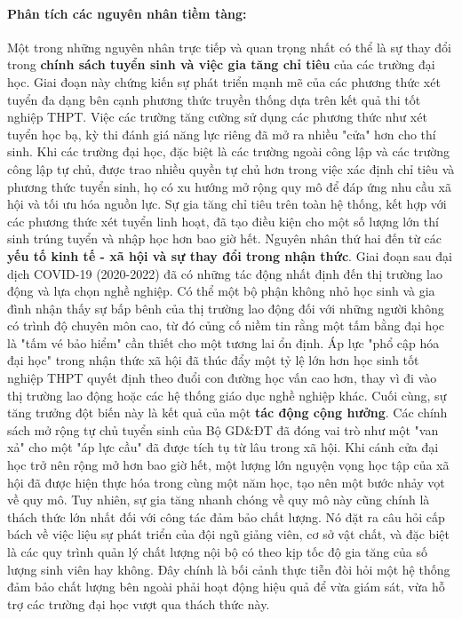 \documentclass[12pt, a4paper, openany]{report}
\begin{document}
\paragraph{Phân tích các nguyên nhân tiềm tàng:}
Một trong những nguyên nhân trực tiếp và quan trọng nhất có thể là sự thay đổi trong \textbf{chính sách tuyển sinh và việc gia tăng chỉ tiêu} của các trường đại học. Giai đoạn này chứng kiến sự phát triển mạnh mẽ của các phương thức xét tuyển đa dạng bên cạnh phương thức truyền thống dựa trên kết quả thi tốt nghiệp THPT. Việc các trường tăng cường sử dụng các phương thức như xét tuyển học bạ, kỳ thi đánh giá năng lực riêng đã mở ra nhiều "cửa" hơn cho thí sinh. Khi các trường đại học, đặc biệt là các trường ngoài công lập và các trường công lập tự chủ, được trao nhiều quyền tự chủ hơn trong việc xác định chỉ tiêu và phương thức tuyển sinh, họ có xu hướng mở rộng quy mô để đáp ứng nhu cầu xã hội và tối ưu hóa nguồn lực. Sự gia tăng chỉ tiêu trên toàn hệ thống, kết hợp với các phương thức xét tuyển linh hoạt, đã tạo điều kiện cho một số lượng lớn thí sinh trúng tuyển và nhập học hơn bao giờ hết.
Nguyên nhân thứ hai đến từ các \textbf{yếu tố kinh tế - xã hội và sự thay đổi trong nhận thức}. Giai đoạn sau đại dịch COVID-19 (2020-2022) đã có những tác động nhất định đến thị trường lao động và lựa chọn nghề nghiệp. Có thể một bộ phận không nhỏ học sinh và gia đình nhận thấy sự bấp bênh của thị trường lao động đối với những người không có trình độ chuyên môn cao, từ đó củng cố niềm tin rằng một tấm bằng đại học là "tấm vé bảo hiểm" cần thiết cho một tương lai ổn định. Áp lực "phổ cập hóa đại học" trong nhận thức xã hội đã thúc đẩy một tỷ lệ lớn hơn học sinh tốt nghiệp THPT quyết định theo đuổi con đường học vấn cao hơn, thay vì đi vào thị trường lao động hoặc các hệ thống giáo dục nghề nghiệp khác.
Cuối cùng, sự tăng trưởng đột biến này là kết quả của một \textbf{tác động cộng hưởng}. Các chính sách mở rộng tự chủ tuyển sinh của Bộ GD\&ĐT đã đóng vai trò như một "van xả" cho một "áp lực cầu" đã được tích tụ từ lâu trong xã hội. Khi cánh cửa đại học trở nên rộng mở hơn bao giờ hết, một lượng lớn nguyện vọng học tập của xã hội đã được hiện thực hóa trong cùng một năm học, tạo nên một bước nhảy vọt về quy mô.
Tuy nhiên, sự gia tăng nhanh chóng về quy mô này cũng chính là thách thức lớn nhất đối với công tác đảm bảo chất lượng. Nó đặt ra câu hỏi cấp bách về việc liệu sự phát triển của đội ngũ giảng viên, cơ sở vật chất, và đặc biệt là các quy trình quản lý chất lượng nội bộ có theo kịp tốc độ gia tăng của số lượng sinh viên hay không. Đây chính là bối cảnh thực tiễn đòi hỏi một hệ thống đảm bảo chất lượng bên ngoài phải hoạt động hiệu quả để vừa giám sát, vừa hỗ trợ các trường đại học vượt qua thách thức này.
\end{document}
